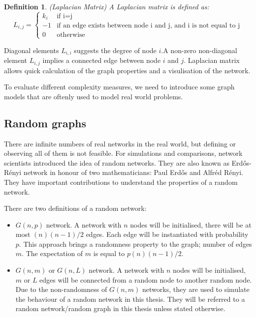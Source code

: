 \documentclass[12pt]{article}
\newtheorem{definition}{Definition}[section]
\begin{document}
\begin{definition}{(Laplacian Matrix)}
    A Laplacian matrix is defined as:
    \begin{equation}
        L_{i,j} = \begin{cases}
            k_{i}& \text{if i=j}\\
            -1 & \text{if an edge exists between node i and j, and i is not equal to j}\\
            0 & \text{otherwise}
        \end{cases}
    \end{equation}
\end{definition}
\par
Diagonal elements $L_{i,i}$ suggests the degree of node $i$.A non-zero non-diagonal element $L_{i,j}$ implies a connected edge between node $i$ and $j$. Laplacian matrix allows quick calculation of the graph properties and a visulisation of the network.

\par
To evaluate different complexity measures, we need to introduce some graph models that are oftenly used to model real world problems.
\subsection{Random graphs}
There are infinite numbers of real networks in the real world, but defining or observing all of them is not feasible. For simulations and comparisons, network scientists introduced the idea of random networks. They are also known as Erd\H{o}s-R\'{e}nyi network in honour of two mathematicians: Paul Erd\H{o}s and Alfr\'{e}d R\'{e}nyi. They have important contributions to understand the properties of a random network\cite{renyi1959random}.\\
\par
There are two definitions of a random network:
\begin{itemize}
    \item $G(n,p)$ network. A network with $n$ nodes will be initialised, there will be at most $(n)(n-1)/2$ edges. Each edge will be instantiated with probability $p$. This approach brings a randomness property to the graph; number of edges $m$. The expectation of $m$ is equal to $p(n)(n-1)/2$.
    \item $G(n,m)$ or $G(n,L)$ network. A network with $n$ nodes will be initialised, $m$ or $L$ edges will be connected from a random node to another random node. Due to the non-randomness of $G(n,m)$ networks, they are used to simulate the behaviour of a random network in this thesis. They will be referred to a random network/random graph in this thesis unless stated otherwise.
\end{itemize}
\end{document}
